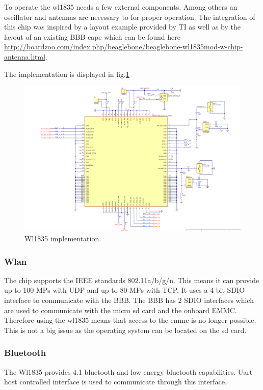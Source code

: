 To operate the wl1835 needs a few external components. Among others an oscillator and antennas are necessary to for proper operation.
The integration of this chip was inspired by a layout example provided by TI as well as by the layout of an existing BBB cape which can be found here \url{http://boardzoo.com/index.php/beaglebone/beaglebone-wl1835mod-w-chip-antenna.html}.

The implementation is displayed in fig.\ref{fig:wl1835 chip}



\begin{figure}[!htb]
    \centering
    \includegraphics[width=1\textwidth,keepaspectratio]{chap/hardFig/wl1835_chip_sch}
    \caption{Wl1835 implementation.}
    \label{fig:wl1835 chip}
\end{figure}

\subsubsection{Wlan}
The chip supports the IEEE standards 802.11a/b/g/n. This means it can provide up to 100 MPs with UDP and up to 80 MPs with TCP.
It uses a 4 bit SDIO interface to communicate with the BBB. The BBB has 2 SDIO interfaces which are used to communicate with the micro sd card and the onboard EMMC. Therefore using the wl1835 means that access to the emmc is no longer possible. This is not a big issue as the operating system can be located on the sd card.


\subsubsection{Bluetooth}
The Wl1835 provides 4.1 bluetooth and low energy bluetooth capabilities. Uart host controlled interface is used to communicate through this interface.

